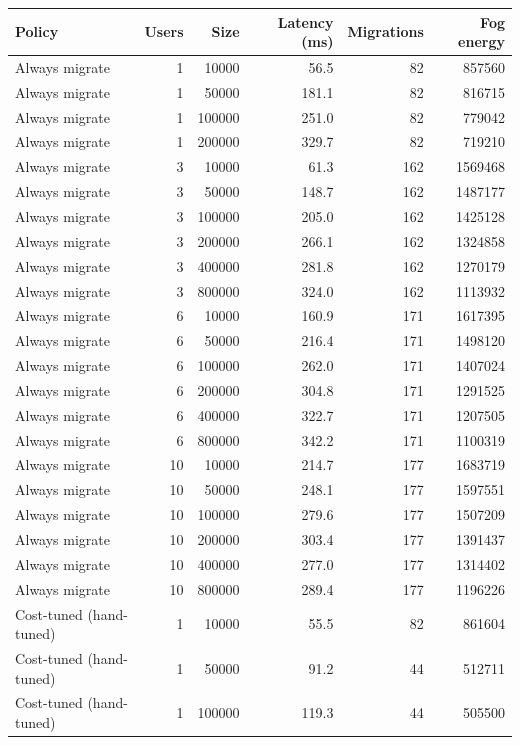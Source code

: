 \begin{table}[h]
\centering
\begin{tabular}{@{}lrrrrr@{}}
\toprule
Policy & Users & Size & Latency (ms) & Migrations & Fog energy \\
\midrule
Always migrate & 1 & 10000 & 56.5 & 82 & 857560 \\
Always migrate & 1 & 50000 & 181.1 & 82 & 816715 \\
Always migrate & 1 & 100000 & 251.0 & 82 & 779042 \\
Always migrate & 1 & 200000 & 329.7 & 82 & 719210 \\
Always migrate & 3 & 10000 & 61.3 & 162 & 1569468 \\
Always migrate & 3 & 50000 & 148.7 & 162 & 1487177 \\
Always migrate & 3 & 100000 & 205.0 & 162 & 1425128 \\
Always migrate & 3 & 200000 & 266.1 & 162 & 1324858 \\
Always migrate & 3 & 400000 & 281.8 & 162 & 1270179 \\
Always migrate & 3 & 800000 & 324.0 & 162 & 1113932 \\
Always migrate & 6 & 10000 & 160.9 & 171 & 1617395 \\
Always migrate & 6 & 50000 & 216.4 & 171 & 1498120 \\
Always migrate & 6 & 100000 & 262.0 & 171 & 1407024 \\
Always migrate & 6 & 200000 & 304.8 & 171 & 1291525 \\
Always migrate & 6 & 400000 & 322.7 & 171 & 1207505 \\
Always migrate & 6 & 800000 & 342.2 & 171 & 1100319 \\
Always migrate & 10 & 10000 & 214.7 & 177 & 1683719 \\
Always migrate & 10 & 50000 & 248.1 & 177 & 1597551 \\
Always migrate & 10 & 100000 & 279.6 & 177 & 1507209 \\
Always migrate & 10 & 200000 & 303.4 & 177 & 1391437 \\
Always migrate & 10 & 400000 & 277.0 & 177 & 1314402 \\
Always migrate & 10 & 800000 & 289.4 & 177 & 1196226 \\
Cost-tuned (hand-tuned) & 1 & 10000 & 55.5 & 82 & 861604 \\
Cost-tuned (hand-tuned) & 1 & 50000 & 91.2 & 44 & 512711 \\
Cost-tuned (hand-tuned) & 1 & 100000 & 119.3 & 44 & 505500 \\

\end{tabular}
\end{table}
